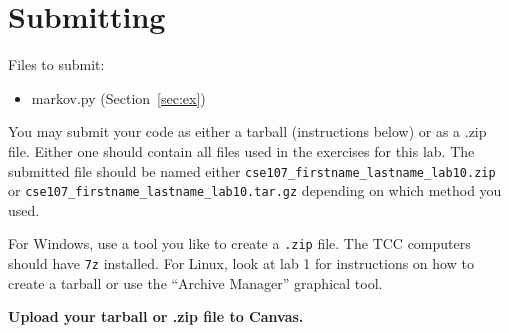 \documentclass[11pt]{cselabheader}
\begin{document}
\pagebreak
\section{Submitting}

Files to submit:
\begin{itemize}
\item markov.py (Section~\ref{sec:ex})
\end{itemize}

You may submit your code as either a tarball (instructions below) or as a .zip
file. Either one should contain all files used in the exercises for this lab.
The submitted file should be named either
\texttt{cse107\_firstname\_lastname\_lab10.zip} or
\texttt{cse107\_firstname\_lastname\_lab10.tar.gz} depending on which method you
used.

For Windows, use a tool you like to create a \texttt{.zip} file. The TCC
computers should have \texttt{7z} installed. For Linux, look at lab 1 for
instructions on how to create a tarball or use the ``Archive Manager'' graphical
tool.

\begin{center}
  \textbf{Upload your tarball or .zip file to Canvas.}
\end{center}
\end{document}
